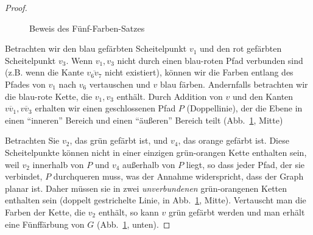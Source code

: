 \begin{proof}
\begin{figure}
\begin{center}
\end{center}
\caption{Beweis des Fünf-Farben-Satzes}\label{f.five-color-proof}
\end{figure}

Betrachten wir den blau gefärbten Scheitelpunkt $v_1$ und den rot gefärbten Scheitelpunkt $v_3$. Wenn $v_1,v_3$ nicht durch einen blau-roten Pfad verbunden sind (z.B. wenn die Kante $\overline{v_6v_7}$ nicht existiert), können wir die Farben entlang des Pfades von $v_1$ nach $v_6$ vertauschen und $v$ blau färben. Andernfalls betrachten wir die blau-rote Kette, die $v_1,v_3$ enthält. Durch Addition von $v$ und den Kanten $\overline{vv_1},\overline{vv_3}$ erhalten wir einen geschlossenen Pfad $P$ (Doppellinie), der die Ebene in einen ``inneren'' Bereich und einen ``äußeren'' Bereich teilt (Abb.~\ref{f.five-color-proof}, Mitte)

Betrachten Sie $v_2$, das grün gefärbt ist, und $v_4$, das orange gefärbt ist. Diese Scheitelpunkte können nicht in einer einzigen grün-orangen Kette enthalten sein, weil $v_2$ innerhalb von $P$ und $v_4$ außerhalb von $P$ liegt, so dass jeder Pfad, der sie verbindet, $P$ durchqueren muss, was der Annahme widerspricht, dass der Graph planar ist. Daher müssen sie in zwei \emph{unverbundenen} grün-orangenen Ketten enthalten sein (doppelt gestrichelte Linie, in Abb.~\ref{f.five-color-proof}, Mitte).
Vertauscht man die Farben der Kette, die $v_2$ enthält, so kann $v$ grün gefärbt werden und man erhält eine Fünffärbung von $G$ (Abb.~\ref{f.five-color-proof}, unten).
\end{proof}

